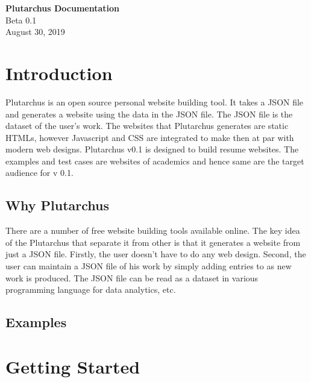 \documentclass[12pt]{article}
\newcommand{\blank}[1]{\hspace*{#1}\linebreak[0]}
\begin{document}
\begin{titlepage}
    \begin{center}
        \vspace*{1cm}
        \Huge
        \textbf{Plutarchus Documentation}
        \\
        \LARGE
        \vspace{0.5cm}
         Beta 0.1
         \\
        \vspace{0.5cm}
        \vspace{8.5cm}
        \vspace{0.8cm}
        \hspace{2cm}
        \blank{6cm} August 30, 2019
    \end{center}
 \end{titlepage}
 
    \tableofcontents
    \newpage
    \section{Introduction}

    Plutarchus is an open source personal website building tool. It takes a JSON file and generates a website using the data in the JSON file. The JSON file is the dataset of the user's work. The websites that Plutarchus generates are static HTMLs, however Javascript and CSS are integrated to make then at par with modern web designs. Plutarchus v0.1 is designed to build resume websites.
    The examples and test cases are websites of academics and hence same are the target audience for v 0.1.      
 
    \subsection{Why Plutarchus}

    There are a number of free website building tools available online. The key idea of the Plutarchus that separate it from other is that it generates a website from just a JSON file. Firstly, the user doesn't have to do any web design. Second, the user can maintain a JSON file of his work by simply adding entries to as new work is produced. The JSON file can be read as a dataset in various programming language for data analytics, etc.  
    

    \subsection{Examples}
    \section{Getting Started}
\end{document}
